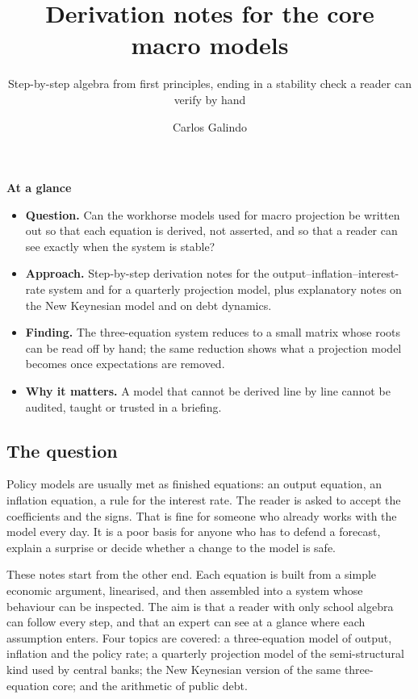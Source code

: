 \documentclass[
  british,
  a4paper,
]{article}
\title{Derivation notes for the core macro models}
\subtitle{Step-by-step algebra from first principles, ending in a
stability check a reader can verify by hand}
\author{Carlos Galindo}
\date{}
\providecommand{\tightlist}{%
  \setlength{\itemsep}{0pt}\setlength{\parskip}{0pt}}
\begin{document}
\maketitle


\begin{tcolorbox}[enhanced jigsaw, arc=.35mm, bottomrule=.15mm, breakable, colback=white, colframe=quarto-callout-note-color-frame, left=2mm, leftrule=.75mm, opacityback=0, rightrule=.15mm, toprule=.15mm]

\vspace{-3mm}\textbf{At a glance}\vspace{3mm}

\begin{itemize}
\tightlist
\item
  \textbf{Question.} Can the workhorse models used for macro projection
  be written out so that each equation is derived, not asserted, and so
  that a reader can see exactly when the system is stable?
\item
  \textbf{Approach.} Step-by-step derivation notes for the
  output--inflation--interest-rate system and for a quarterly projection
  model, plus explanatory notes on the New Keynesian model and on debt
  dynamics.
\item
  \textbf{Finding.} The three-equation system reduces to a small matrix
  whose roots can be read off by hand; the same reduction shows what a
  projection model becomes once expectations are removed.
\item
  \textbf{Why it matters.} A model that cannot be derived line by line
  cannot be audited, taught or trusted in a briefing.
\end{itemize}

\end{tcolorbox}

\subsection{The question}\label{the-question}

Policy models are usually met as finished equations: an output equation,
an inflation equation, a rule for the interest rate. The reader is asked
to accept the coefficients and the signs. That is fine for someone who
already works with the model every day. It is a poor basis for anyone
who has to defend a forecast, explain a surprise or decide whether a
change to the model is safe.

These notes start from the other end. Each equation is built from a
simple economic argument, linearised, and then assembled into a system
whose behaviour can be inspected. The aim is that a reader with only
school algebra can follow every step, and that an expert can see at a
glance where each assumption enters. Four topics are covered: a
three-equation model of output, inflation and the policy rate; a
quarterly projection model of the semi-structural kind used by central
banks; the New Keynesian version of the same three-equation core; and
the arithmetic of public debt.
\end{document}
